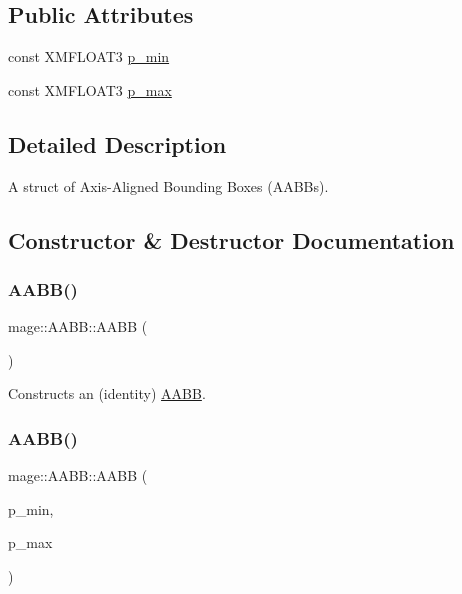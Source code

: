 \subsection*{Public Attributes}
\begin{DoxyCompactItemize}
\item 
const X\+M\+F\+L\+O\+A\+T3 \hyperlink{structmage_1_1_a_a_b_b_aa3794b223acfd4f9dabccde5ae6ce9fb}{p\+\_\+min}
\item 
const X\+M\+F\+L\+O\+A\+T3 \hyperlink{structmage_1_1_a_a_b_b_a91ac7c17f1bbd452984a602296f68fba}{p\+\_\+max}
\end{DoxyCompactItemize}


\subsection{Detailed Description}
A struct of Axis-\/\+Aligned Bounding Boxes (A\+A\+B\+Bs). 

\subsection{Constructor \& Destructor Documentation}
\hypertarget{structmage_1_1_a_a_b_b_ae6db94dcb9165eb008f0be8741f0eb62}{}\label{structmage_1_1_a_a_b_b_ae6db94dcb9165eb008f0be8741f0eb62} 
\subsubsection{\texorpdfstring{A\+A\+B\+B()}{AABB()}\hspace{0.1cm}{\footnotesize\ttfamily [1/2]}}
{\footnotesize\ttfamily mage\+::\+A\+A\+B\+B\+::\+A\+A\+BB (\begin{DoxyParamCaption}{ }\end{DoxyParamCaption})}

Constructs an (identity) \hyperlink{structmage_1_1_a_a_b_b}{A\+A\+BB}. \hypertarget{structmage_1_1_a_a_b_b_ace7530031c44d2343b2b3377e63228d6}{}\label{structmage_1_1_a_a_b_b_ace7530031c44d2343b2b3377e63228d6} 
\subsubsection{\texorpdfstring{A\+A\+B\+B()}{AABB()}\hspace{0.1cm}{\footnotesize\ttfamily [2/2]}}
{\footnotesize\ttfamily mage\+::\+A\+A\+B\+B\+::\+A\+A\+BB (\begin{DoxyParamCaption}\item[{const X\+M\+F\+L\+O\+A\+T3 \&}]{p\+\_\+min,  }\item[{const X\+M\+F\+L\+O\+A\+T3 \&}]{p\+\_\+max }\end{DoxyParamCaption})}

